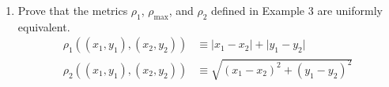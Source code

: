 \documentclass{article}
\begin{document}
\begin{enumerate}
\begin{enumerate}
\begin{proof}
                              \begin{align*}
                                    \rho_2(x, x+\frac{\varepsilon}{2}) & = \left\lvert x-(x+\frac{\varepsilon}{2})\right\rvert \\
                                                                       & = \left\lvert -\frac{\varepsilon}{2}\right\rvert      \\
                                                                       & = \frac{\varepsilon}{2}                               \\
                                                                       & < \varepsilon
                              \end{align*}
                              Because $\varepsilon>0$, $x+\frac{\varepsilon}{2}\neq x$. Therefore, $\rho_2$
                              is not discrete.
                        \end{proof}
                  \item Which of the metrics in Examples $1-5$ are discrete?
                        \medbreak
                        Most metrics in these examples are not discrete. The only one I found
                        was the one in example 5, where $\delta(q, p)$ is essentially normalized hamming
                        distance:
                        \begin{equation}
                              \rho(x,y) \equiv \sum_{i=1}^N\delta(q_i, p_i)
                        \end{equation}
                  \item In a discrete metric space $(\mathcal{M}, \rho)$, what
                        are the convergent sequences?
                        \medbreak
                        The only convergent sequences in discrete metrics are those
                        that are constant under the metric space.
            \end{enumerate}
            \setcounter{enumi}{11}
      \item Prove that the metrics $\rho_1$, $\rho_{\max}$, and $\rho_2$ defined
            in Example 3 are uniformly equivalent.
            \begin{align}
                  \rho_1((x_1, y_1), (x_2, y_2))      & \equiv \lvert x_1-x_2\rvert + \lvert y_1-y_2\rvert        \\
                  \rho_2((x_1, y_1), (x_2, y_2))      & \equiv \sqrt{(x_1-x_2)^2 + (y_1-y_2)^2}                   \\

\end{align}
\end{enumerate}
\end{document}
